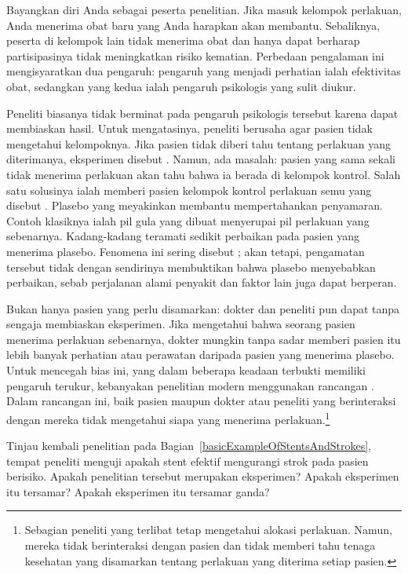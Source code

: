 Bayangkan diri Anda sebagai peserta penelitian. Jika masuk kelompok perlakuan,
Anda menerima obat baru yang Anda harapkan akan membantu. Sebaliknya, peserta
di kelompok lain tidak menerima obat dan hanya dapat berharap partisipasinya
tidak meningkatkan risiko kematian. Perbedaan pengalaman ini mengisyaratkan dua
pengaruh: pengaruh yang menjadi perhatian ialah efektivitas obat, sedangkan yang
kedua ialah pengaruh psikologis yang sulit diukur.

Peneliti biasanya tidak berminat pada pengaruh psikologis tersebut karena dapat
membiaskan hasil. Untuk mengatasinya, peneliti berusaha agar pasien tidak
mengetahui kelompoknya. Jika pasien tidak diberi tahu tentang perlakuan yang
diterimanya, eksperimen disebut . Namun, ada masalah: pasien yang
sama sekali tidak menerima perlakuan akan tahu bahwa ia berada di kelompok
kontrol. Salah satu solusinya ialah memberi pasien kelompok kontrol perlakuan
semu yang disebut . Plasebo yang meyakinkan membantu mempertahankan
penyamaran. Contoh klasiknya ialah pil gula yang dibuat menyerupai pil perlakuan
yang sebenarnya. Kadang-kadang teramati sedikit perbaikan pada pasien yang
menerima plasebo. Fenomena ini sering disebut ; akan tetapi,
pengamatan tersebut tidak dengan sendirinya membuktikan bahwa plasebo menyebabkan
perbaikan, sebab perjalanan alami penyakit dan faktor lain juga dapat berperan.

Bukan hanya pasien yang perlu disamarkan: dokter dan peneliti pun dapat tanpa
sengaja membiaskan eksperimen. Jika mengetahui bahwa seorang pasien menerima
perlakuan sebenarnya, dokter mungkin tanpa sadar memberi pasien itu lebih banyak
perhatian atau perawatan daripada pasien yang menerima plasebo. Untuk mencegah
bias ini, yang dalam beberapa keadaan terbukti memiliki pengaruh terukur,
kebanyakan penelitian modern menggunakan rancangan .
Dalam rancangan ini, baik pasien maupun dokter atau peneliti yang berinteraksi
dengan mereka tidak mengetahui siapa yang menerima perlakuan.\footnote{Sebagian
peneliti yang terlibat tetap mengetahui alokasi perlakuan. Namun, mereka tidak
berinteraksi dengan pasien dan tidak memberi tahu tenaga kesehatan yang
disamarkan tentang perlakuan yang diterima setiap pasien.}

\begin{exercisewrap}
\begin{nexercise}
Tinjau kembali penelitian pada Bagian~\ref{basicExampleOfStentsAndStrokes},
tempat peneliti menguji apakah stent efektif mengurangi strok pada pasien
berisiko. Apakah penelitian tersebut merupakan eksperimen? Apakah eksperimen
itu tersamar? Apakah eksperimen itu tersamar ganda?\footnotemark{}
\end{nexercise}
\end{exercisewrap}


